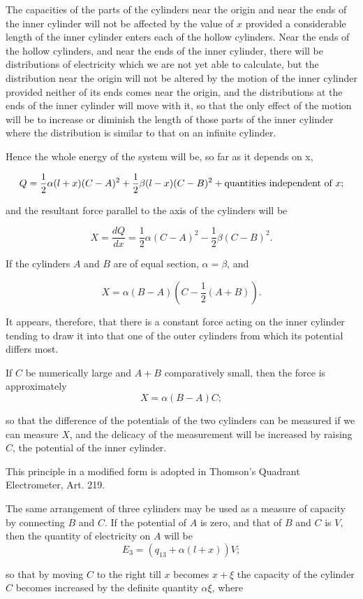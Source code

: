 \documentclass[11pt,a4paper]{article}
\begin{document}
The capacities of the parts of the cylinders near the origin and near the ends of the inner cylinder will not be affected by the value of $x$ provided a considerable length of the inner cylinder enters each of the hollow cylinders. Near the ends of the hollow cylinders, and near the ends of the inner cylinder, there will be distributions of electricity which we are not yet able to calculate, but the distribution near the origin will not be altered by the motion of the inner cylinder provided neither of its ends comes near the origin, and the distributions at the ends of the inner cylinder will move with it, so that the only effect of the motion will be to increase or diminish the length of those parts of the inner cylinder where the distribution is similar to that on an infinite cylinder.

Hence the whole energy of the system will be, so far as it depends on x,

\[
Q=\frac{1}{2}\alpha(l+x)(C-A)^2+\frac{1}{2}\beta(l-x)(C-B)^2+\hbox{quantities independent of }x;
\]

and the resultant force parallel to the axis of the cylinders will be

\[
X=\frac{dQ}{dx}=\frac{1}{2}\alpha(C-A)^2-\frac{1}{2}\beta(C-B)^2.
\]

If the cylinders $A$ and $B$ are of equal section, $\alpha=\beta$, and

\[
X=\alpha(B-A)\left(C-\frac{1}{2}(A+B)\right).
\]

It appears, therefore, that there is a constant force acting on the inner cylinder tending to draw it into that one of the outer cylinders from which its potential differs most.

If $C$ be numerically large and $A+B$ comparatively small, then the force is approximately
\[
X=\alpha(B-A)C;
\]

so that the difference of the potentials of the two cylinders can be measured if we can measure $X$, and the delicacy of the measurement will be increased by raising $C$, the potential of the inner cylinder.

This principle in a modified form is adopted in Thomson's Quadrant Electrometer, Art. 219.

The same arrangement of three cylinders may be used as a measure of capacity by connecting $B$ and $C$. If the potential of $A$ is zero, and that of $B$ and $C$ is $V$, then the quantity of electricity on $A$ will be
\[
E_3=(q_{13}+\alpha(l+x))V;
\]

so that by moving $C$ to the right till $x$ becomes $x+\xi$ the capacity of the cylinder $C$ becomes increased by the definite quantity $\alpha\xi$, where
\end{document}
